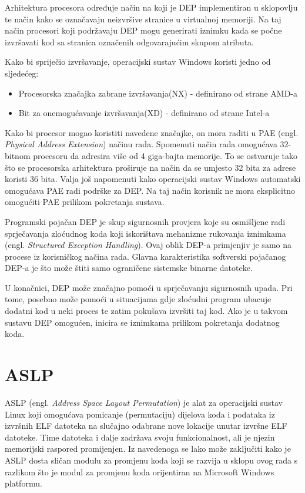 \documentclass[times, utf8, diplomski, numeric]{fer}
\begin{document}
Arhitektura procesora određuje način na koji je DEP implementiran
u sklopovlju te način kako se označavaju neizvršive stranice u virtualnoj memoriji.
Na taj način procesori koji podržavaju DEP mogu generirati
iznimku kada se počne izvršavati kod sa stranica označenih
odgovarajućim skupom atributa.

Kako bi spriječio izvršavanje, operacijski sustav Windows koristi
jedno od sljedećeg:

\begin{itemize}
\item Procesorska značajka zabrane izvršavanja(NX) - definirano od strane AMD-a
\item Bit za onemogućavanje izvršavanja(XD) - definirano od strane Intel-a
\end{itemize}

Kako bi procesor mogao koristiti navedene značajke, on mora
raditi u PAE (engl. \emph{Physical Address
Extension}) \citep{pae_ms} načinu rada. Spomenuti način rada
omogućava 32-bitnom procesoru da adresira više od 4 giga-bajta
memorije. To se ostvaruje tako što se procesorska arhitektura
proširuje na način da se umjesto 32 bita za adrese koristi 36
bita. Valja još napomenuti kako operacijski sustav Windows
automatski omogućava PAE radi podrške za DEP. Na taj način korisnik
ne mora eksplicitno omogućiti PAE prilikom pokretanja sustava.

Programski pojačan DEP je skup sigurnosnih provjera koje su
osmišljene radi sprječavanja zloćudnog koda koji iskorištava
mehanizme rukovanja iznimkama (engl. \emph{Structured Exception
Handling}). Ovaj oblik DEP-a primjenjiv je samo na procese iz
korisničkog načina rada. Glavna karakteristika softverski
pojačanog DEP-a je što može štiti samo ograničene sistemske
binarne datoteke.

U konačnici, DEP može značajno pomoći u sprječavanju sigurnosnih
upada. Pri tome, posebno može pomoći u situacijama gdje zloćudni
program ubacuje dodatni kod u neki proces te zatim pokušava
izvršiti taj kod. Ako je u takvom sustavu DEP omogućen, inicira
se iznimkama prilikom pokretanja dodatnog koda.

\section{ASLP}
\label{sct:aslp}

ASLP \citep{aslp} (engl. \emph{Address Space Layout Permutation}) 
je alat za operacijski sustav Linux koji omogućava pomicanje
(permutaciju) dijelova koda i podataka iz izvršnih ELF datoteka
na slučajno odabrane nove lokacije unutar izvršne ELF datoteke.
Time datoteka i dalje zadržava svoju funkcionalnost, ali je
njezin memorijski raspored promijenjen. Iz navedenoga se lako
može zaključiti kako je ASLP dosta sličan modulu za promjenu koda
koji se razvija u sklopu ovog rada s razlikom što je modul za
promjenu koda orijentiran na Microsoft Windows platformu. 
\end{document}
